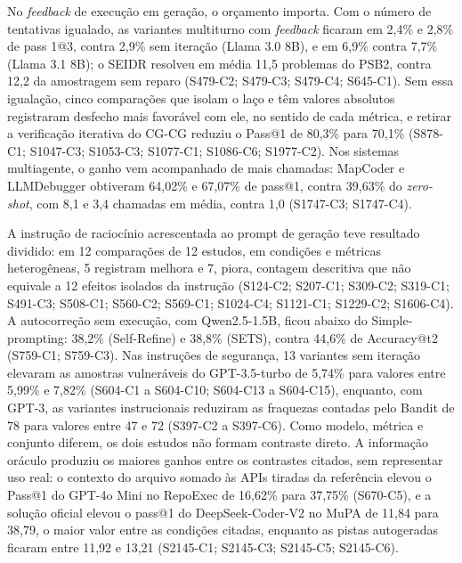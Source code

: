 No \textit{feedback} de execução em geração, o orçamento importa.
Com o número de tentativas igualado, as variantes multiturno com \textit{feedback} ficaram em
2,4\% e 2,8\% de pass 1@3, contra 2,9\% sem iteração (Llama 3.0 8B), e em 6,9\% contra
7,7\% (Llama 3.1 8B); o SEIDR resolveu em média 11,5 problemas do PSB2, contra 12,2 da
amostragem sem reparo (S479-C2; S479-C3; S479-C4; S645-C1).
Sem essa igualação, cinco comparações que isolam o laço e têm valores
absolutos registraram desfecho mais favorável com ele, no sentido de cada métrica, e retirar a verificação iterativa do CG-CG
reduziu o Pass@1 de 80,3\% para 70,1\% (S878-C1; S1047-C3; S1053-C3; S1077-C1;
S1086-C6; S1977-C2).
Nos sistemas multiagente, o ganho vem acompanhado de mais chamadas: MapCoder e
LLMDebugger obtiveram 64,02\% e 67,07\% de pass@1, contra 39,63\% do \textit{zero-shot}, com 8,1
e 3,4 chamadas em média, contra 1,0 (S1747-C3; S1747-C4).

A instrução de raciocínio acrescentada ao prompt de geração teve resultado dividido: em
12 comparações de 12 estudos, em condições e métricas heterogêneas, 5 registram melhora e 7, piora, contagem
descritiva que não equivale a 12 efeitos isolados da instrução (S124-C2; S207-C1; S309-C2; S319-C1; S491-C3; S508-C1;
S560-C2; S569-C1; S1024-C4; S1121-C1; S1229-C2; S1606-C4).
A autocorreção sem execução, com Qwen2.5-1.5B, ficou abaixo do Simple-prompting: 38,2\%
(Self-Refine) e 38,8\% (SETS), contra 44,6\% de Accuracy@t2 (S759-C1; S759-C3).
Nas instruções de segurança, 13 variantes sem iteração elevaram as amostras vulneráveis
do GPT-3.5-turbo de 5,74\% para valores entre 5,99\% e 7,82\% (S604-C1 a S604-C10;
S604-C13 a S604-C15), enquanto, com GPT-3, as variantes instrucionais reduziram as
fraquezas contadas pelo Bandit de 78 para valores entre 47 e 72 (S397-C2 a S397-C6).
Como modelo, métrica e conjunto diferem, os dois estudos não formam contraste direto.
A informação oráculo produziu os maiores ganhos entre os contrastes citados, sem representar uso real: o contexto
do arquivo somado às APIs tiradas da referência elevou o Pass@1 do GPT-4o Mini no RepoExec de 16,62\% para 37,75\%
(S670-C5), e a solução oficial elevou o pass@1 do DeepSeek-Coder-V2 no MuPA de 11,84 para 38,79, o maior valor entre as condições citadas, enquanto as pistas autogeradas ficaram entre 11,92 e 13,21 (S2145-C1; S2145-C3;
S2145-C5; S2145-C6).


